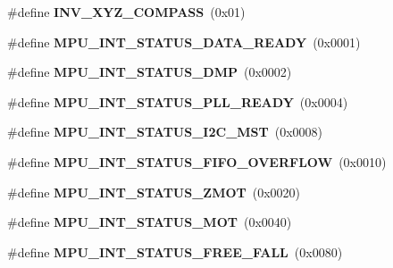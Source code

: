 \begin{DoxyCompactItemize}
\item 
\#define {\bfseries I\+N\+V\+\_\+\+X\+Y\+Z\+\_\+\+C\+O\+M\+P\+A\+SS}~(0x01)\hypertarget{group___d_r_i_v_e_r_s_ga7fc9c1dbdcb2ac8cc2a4128a5799482a}{}\label{group___d_r_i_v_e_r_s_ga7fc9c1dbdcb2ac8cc2a4128a5799482a}

\item 
\#define {\bfseries M\+P\+U\+\_\+\+I\+N\+T\+\_\+\+S\+T\+A\+T\+U\+S\+\_\+\+D\+A\+T\+A\+\_\+\+R\+E\+A\+DY}~(0x0001)\hypertarget{group___d_r_i_v_e_r_s_ga0cddf0dffaf3bf65fd3ed92dda4f3193}{}\label{group___d_r_i_v_e_r_s_ga0cddf0dffaf3bf65fd3ed92dda4f3193}

\item 
\#define {\bfseries M\+P\+U\+\_\+\+I\+N\+T\+\_\+\+S\+T\+A\+T\+U\+S\+\_\+\+D\+MP}~(0x0002)\hypertarget{group___d_r_i_v_e_r_s_ga380dd1ef256931e99302c371ad7752f4}{}\label{group___d_r_i_v_e_r_s_ga380dd1ef256931e99302c371ad7752f4}

\item 
\#define {\bfseries M\+P\+U\+\_\+\+I\+N\+T\+\_\+\+S\+T\+A\+T\+U\+S\+\_\+\+P\+L\+L\+\_\+\+R\+E\+A\+DY}~(0x0004)\hypertarget{group___d_r_i_v_e_r_s_gaa38d7976e86186bf353cb89ca7561f29}{}\label{group___d_r_i_v_e_r_s_gaa38d7976e86186bf353cb89ca7561f29}

\item 
\#define {\bfseries M\+P\+U\+\_\+\+I\+N\+T\+\_\+\+S\+T\+A\+T\+U\+S\+\_\+\+I2\+C\+\_\+\+M\+ST}~(0x0008)\hypertarget{group___d_r_i_v_e_r_s_ga5755e84f3a2e7d331f7612dbfea18ecc}{}\label{group___d_r_i_v_e_r_s_ga5755e84f3a2e7d331f7612dbfea18ecc}

\item 
\#define {\bfseries M\+P\+U\+\_\+\+I\+N\+T\+\_\+\+S\+T\+A\+T\+U\+S\+\_\+\+F\+I\+F\+O\+\_\+\+O\+V\+E\+R\+F\+L\+OW}~(0x0010)\hypertarget{group___d_r_i_v_e_r_s_gaf8e1684698ad837d0318a72b1ef73b13}{}\label{group___d_r_i_v_e_r_s_gaf8e1684698ad837d0318a72b1ef73b13}

\item 
\#define {\bfseries M\+P\+U\+\_\+\+I\+N\+T\+\_\+\+S\+T\+A\+T\+U\+S\+\_\+\+Z\+M\+OT}~(0x0020)\hypertarget{group___d_r_i_v_e_r_s_gad5eee7ff393f842ca4ae969cc0019030}{}\label{group___d_r_i_v_e_r_s_gad5eee7ff393f842ca4ae969cc0019030}

\item 
\#define {\bfseries M\+P\+U\+\_\+\+I\+N\+T\+\_\+\+S\+T\+A\+T\+U\+S\+\_\+\+M\+OT}~(0x0040)\hypertarget{group___d_r_i_v_e_r_s_gaa1ab51fb5995e568edd425f8486cb2c8}{}\label{group___d_r_i_v_e_r_s_gaa1ab51fb5995e568edd425f8486cb2c8}

\item 
\#define {\bfseries M\+P\+U\+\_\+\+I\+N\+T\+\_\+\+S\+T\+A\+T\+U\+S\+\_\+\+F\+R\+E\+E\+\_\+\+F\+A\+LL}~(0x0080)\hypertarget{group___d_r_i_v_e_r_s_ga000cfa5230cb895c6bad322856465552}{}\label{group___d_r_i_v_e_r_s_ga000cfa5230cb895c6bad322856465552}


\end{DoxyCompactItemize}
